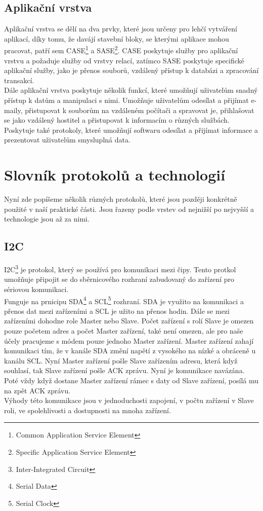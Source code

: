 \documentclass[12pt]{report}			%
\begin{document}
				\subsection{Aplikační vrstva}
Aplikační vrstva se dělí na dva prvky, které jsou určeny pro lehčí vytváření aplikací, díky tomu, že davájí stavební bloky, se kterými aplikace mohou pracovat, patří sem CASE\footnote{Common Application Service Element} a SASE\footnote{Specific Application Service Element}. CASE poskytuje služby pro aplikační vrstvu a požaduje služby od vrstvy relací, zatímco SASE poskytuje specifické aplikační služby, jako je přenos souborů, vzdálený přístup k databázi a zpracování transakcí.
\\
Dále aplikační vrstva poskytuje několik funkcí, které umožňují uživatelům snadný přístup k datům a manipulaci s nimi. Umožňuje uživatelům odesílat a přijímat e-maily, přistupovat k souborům na vzdáleném počítači a spravovat je, přihlašovat se jako vzdálený hostitel a přistupovat k informacím o různých službách. Poskytuje také protokoly, které umožňují softwaru odesílat a přijímat informace a prezentovat uživatelům smysluplná data.\cite{aplication1}\cite{aplication2}\cite{aplication3}

			\section{Slovník protokolů a technologií}
Nyní zde popíšeme několik různých protokolů, které jsou později konkrétně použité v naší praktické části. Jsou řazeny podle vrstev od nejnižší po nejvyšší a technologie jsou až za nimi.
				\subsection{I2C}
I2C\footnote{Inter-Integrated Circuit} je protokol, který se používá pro komunikaci mezi čipy. Tento protkol umožňuje připojit se do sběrnicového rozhraní zabudovaný do zařízení pro sériovou komunikaci. 
\\
Funguje na prnicipu SDA\footnote{Serial Data} a SCL\footnote{Serial Clock} rozhraní. SDA je využito na komunikaci a přenos dat mezi zařízeními a SCL je užito na přenos hodin. Dále se mezi zařízeními dohodne role Master nebo Slave. Počet zařízení s rolí Slave je omezen pouze početem adres a počet Master zařízení, také není omezen, ale pro naše účely pracujeme s módem pouze jednoho Master zařízení. Master zařízení zahají komunikaci tím, že v kanále SDA změní napětí z vysokého na nízké a obráceně u kanálu SCL. Nyní Master zařízení pošle Slave zařízením adresu, která když souhlasí, tak Slave zařízení pošle ACK zprávu. Nyní je komunikace navázána. Poté vždy když dostane Master zařízení rámec s daty od Slave zařízení, posílá mu na zpět ACK zprávu.
\\
Výhody této komunikace jsou v jednoduchosti zapojení, v počtu zařízení v Slave roli, ve spolehlivosti a dostupnosti na mnoha zařízení.  \cite{i2c1}\cite{i2c2}\cite{i2c3}\cite{i2c4}
\end{document}
